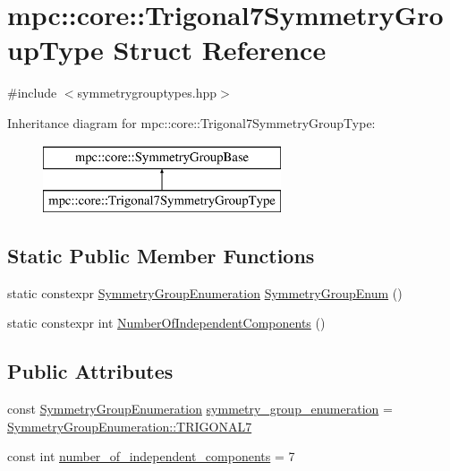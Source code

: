\hypertarget{structmpc_1_1core_1_1_trigonal7_symmetry_group_type}{}\section{mpc\+:\+:core\+:\+:Trigonal7\+Symmetry\+Group\+Type Struct Reference}
\label{structmpc_1_1core_1_1_trigonal7_symmetry_group_type}


{\ttfamily \#include $<$symmetrygrouptypes.\+hpp$>$}

Inheritance diagram for mpc\+:\+:core\+:\+:Trigonal7\+Symmetry\+Group\+Type\+:\begin{figure}[H]
\begin{center}
\leavevmode
\includegraphics[height=2.000000cm]{structmpc_1_1core_1_1_trigonal7_symmetry_group_type}
\end{center}
\end{figure}
\subsection*{Static Public Member Functions}
\begin{DoxyCompactItemize}
\item 
static constexpr \mbox{\hyperlink{namespacempc_1_1core_a9d979684062547055a0ef5c13077bad8}{Symmetry\+Group\+Enumeration}} \mbox{\hyperlink{structmpc_1_1core_1_1_trigonal7_symmetry_group_type_abc384a0cbee42df56c3afcf55915547d}{Symmetry\+Group\+Enum}} ()
\item 
static constexpr int \mbox{\hyperlink{structmpc_1_1core_1_1_trigonal7_symmetry_group_type_ac7dc34ebb3ec6a678f8caf53637b420c}{Number\+Of\+Independent\+Components}} ()
\end{DoxyCompactItemize}
\subsection*{Public Attributes}
\begin{DoxyCompactItemize}
\item 
const \mbox{\hyperlink{namespacempc_1_1core_a9d979684062547055a0ef5c13077bad8}{Symmetry\+Group\+Enumeration}} \mbox{\hyperlink{structmpc_1_1core_1_1_trigonal7_symmetry_group_type_af17153b42a8a84d51280a8990e785aa4}{symmetry\+\_\+group\+\_\+enumeration}} = \mbox{\hyperlink{namespacempc_1_1core_a9d979684062547055a0ef5c13077bad8ab347d6d7556c0d38dc3d111b08a50dee}{Symmetry\+Group\+Enumeration\+::\+T\+R\+I\+G\+O\+N\+A\+L7}}
\item 
const int \mbox{\hyperlink{structmpc_1_1core_1_1_trigonal7_symmetry_group_type_ad9ff9e80f62792232b540114819bf1eb}{number\+\_\+of\+\_\+independent\+\_\+components}} = 7
\end{DoxyCompactItemize}


